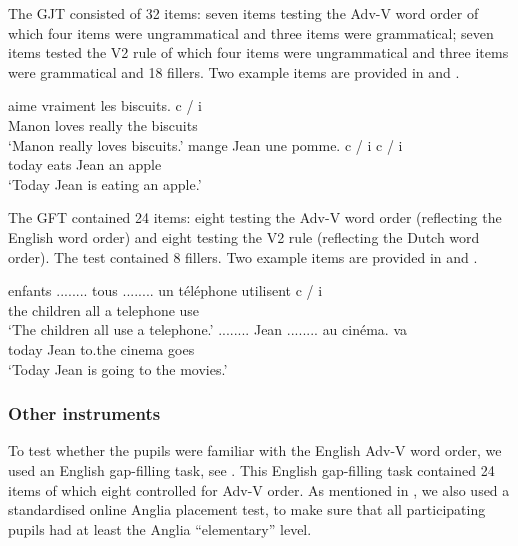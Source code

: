 \documentclass[output=paper]{langsci/langscibook}
\begin{document}
The GJT consisted of 32 items: seven items testing the Adv-V word order of which four items were ungrammatical and three items were grammatical; seven items tested the V2 rule of which four items were ungrammatical and three items were grammatical and 18 fillers. Two example items are provided in  and .

  \ea%
  \label{ex:stadt:2}
   {aime} {vraiment} {les} {biscuits.}    c / i\\
  		Manon loves really     the biscuits\\
  \glt ‘Manon really loves biscuits.’
  \ex %
  \label{ex:stadt:3}
   {mange} {Jean} {une} {pomme.}  c / i   c / i\\
		  today eats Jean an apple\\
  \glt ‘Today Jean is eating an apple.’
  \z



The GFT contained 24 items: eight testing the Adv-V word order (reflecting the English word order) and eight testing the V2 rule (reflecting the Dutch word order). The test contained 8 fillers. Two example items are provided in  and .


  \ea%
  \label{ex:stadt:4}
   {enfants} {........} tous {........} un téléphone utilisent  c / i\\
  	the children {}             all {}           a telephone use\\
  \glt ‘The children all use a telephone.’
  \ex %
  \label{ex:stadt:5}
   {........} {Jean} {........} {au} {cinéma.} {va} \\
 		 today {}          Jean {}           to.the cinema goes\\
  \glt ‘Today Jean is going to the movies.’
  \z


\subsubsection{{Other} {instruments} }
\label{sec:stadt:3.3.2}

To test whether the pupils were familiar with the English Adv-V word order, we used an English gap-filling task, see . This English gap-filling task contained 24 items of which eight controlled for Adv-V order. As mentioned in , we also used a standardised online Anglia placement test, to make sure that all participating pupils had at least the Anglia ``elementary'' level.
\end{document}
